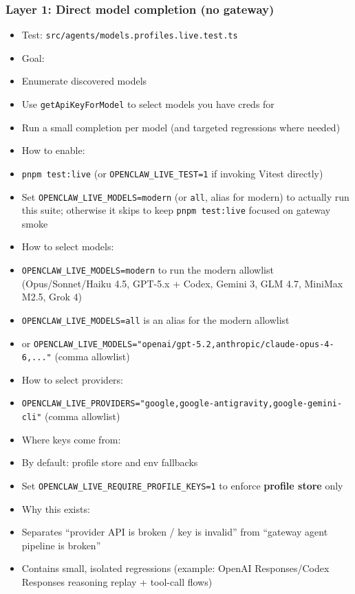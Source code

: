 \subsubsection{Layer 1: Direct model completion (no gateway)}


\begin{itemize}
  \item Test: \texttt{src/agents/models.profiles.live.test.ts}
  \item Goal:
  \item Enumerate discovered models
  \item Use \texttt{getApiKeyForModel} to select models you have creds for
  \item Run a small completion per model (and targeted regressions where needed)
  \item How to enable:
  \item \texttt{pnpm test:live} (or \texttt{OPENCLAW\_LIVE\_TEST=1} if invoking Vitest directly)
  \item Set \texttt{OPENCLAW\_LIVE\_MODELS=modern} (or \texttt{all}, alias for modern) to actually run this suite; otherwise it skips to keep \texttt{pnpm test:live} focused on gateway smoke
  \item How to select models:
  \item \texttt{OPENCLAW\_LIVE\_MODELS=modern} to run the modern allowlist (Opus/Sonnet/Haiku 4.5, GPT-5.x + Codex, Gemini 3, GLM 4.7, MiniMax M2.5, Grok 4)
  \item \texttt{OPENCLAW\_LIVE\_MODELS=all} is an alias for the modern allowlist
  \item or \texttt{OPENCLAW\_LIVE\_MODELS="openai/gpt-5.2,anthropic/claude-opus-4-6,..."} (comma allowlist)
  \item How to select providers:
  \item \texttt{OPENCLAW\_LIVE\_PROVIDERS="google,google-antigravity,google-gemini-cli"} (comma allowlist)
  \item Where keys come from:
  \item By default: profile store and env fallbacks
  \item Set \texttt{OPENCLAW\_LIVE\_REQUIRE\_PROFILE\_KEYS=1} to enforce \textbf{profile store} only
  \item Why this exists:
  \item Separates “provider API is broken / key is invalid” from “gateway agent pipeline is broken”
  \item Contains small, isolated regressions (example: OpenAI Responses/Codex Responses reasoning replay + tool-call flows)
\end{itemize}


